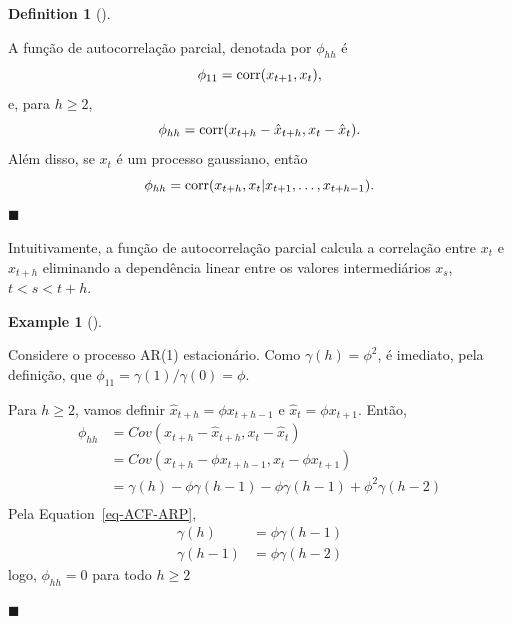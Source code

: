 \documentclass[
  letterpaper,
  DIV=11,
  numbers=noendperiod]{scrartcl}
\theoremstyle{plain}
\theoremstyle{plain}
\theoremstyle{definition}
\newtheorem{example}{Example}[chapter]
\theoremstyle{definition}
\newtheorem{definition}{Definition}[chapter]
\theoremstyle{remark}
\begin{document}
\begin{definition}[]\protect\hypertarget{def-}{}\label{def-}

A função de autocorrelação parcial, denotada por \(\phi_{hh}\) é
\[\phi_{11}=\hbox{corr}(x_{t+1},x_t),\] e, para \(h\geq 2\),
\[\phi_{hh}=\hbox{corr}(x_{t+h}-\hat{x}_{t+h},x_t-\hat{x}_t
).\] Além disso, se \(x_t\) é um processo gaussiano, então
\[\phi_{hh}=\hbox{corr}(x_{t+h},x_t|x_{t+1},\ldots,x_{t+h-1}).\]
\(\blacksquare\)

\end{definition}

Intuitivamente, a função de autocorrelação parcial calcula a correlação
entre \(x_t\) e \(x_{t+h}\) eliminando a dependência linear entre os
valores intermediários \(x_s\), \(t<s<t+h\).

\begin{example}[]\protect\hypertarget{exm-}{}\label{exm-}

Considere o processo AR(1) estacionário. Como \(\gamma(h)=\phi^2\), é
imediato, pela definição, que \(\phi_{11}=\gamma(1)/\gamma(0)=\phi\).

Para \(h\geq 2\), vamos definir \(\hat{x}_{t+h}=\phi x_{t+h-1}\) e
\(\hat{x}_t=\phi x_{t+1}\). Então,
\[\begin{align}\phi_{hh}&=Cov( x_{t+h}-\hat{x}_{t+h},x_t-\hat{x}_t)\\&=Cov( x_{t+h}-\phi x_{t+h-1},x_t-\phi x_{t+1})\\&=
\gamma(h)-\phi\gamma(h-1)-\phi\gamma(h-1)+\phi^2\gamma(h-2)\\
\end{align}\] Pela Equation~\ref{eq-ACF-ARP},
\[\begin{align}\gamma(h)&=\phi \gamma(h-1)\\ \gamma(h-1)&=\phi\gamma(h-2) \end{align}\]
logo, \(\phi_{hh}=0\) para todo \(h\geq 2\)

\(\blacksquare\)

\end{example}
\end{document}
